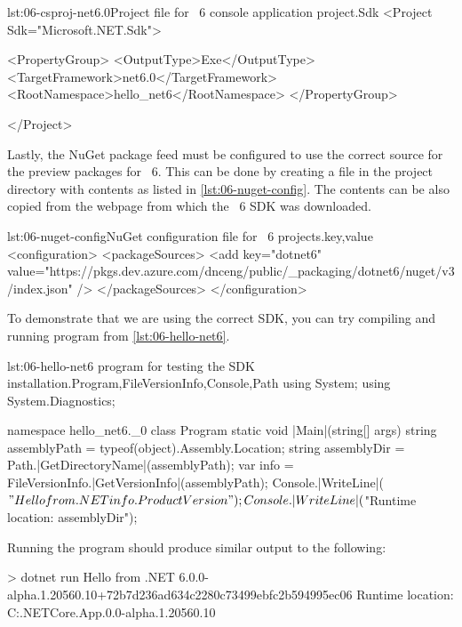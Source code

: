 \begin{myListingXml}{lst:06-csproj-net6.0}{Project file for \dotnet{}~6 console application project.}{Sdk}
<Project Sdk="Microsoft.NET.Sdk">

  <PropertyGroup>
    <OutputType>Exe</OutputType>
    <TargetFramework>net6.0</TargetFramework>
    <RootNamespace>hello_net6</RootNamespace>
  </PropertyGroup>

</Project>
\end{myListingXml}

Lastly, the NuGet package feed must be configured to use the correct source for the preview packages
for \dotnet{}~6. This can be done by creating a  file in the project
directory with contents as listed in \autoref{lst:06-nuget-config}. The contents can be also copied
from the webpage from which the \dotnet{}~6 SDK was downloaded.

\begin{myListingXml}[basicstyle=\ttfamily\scriptsize]{lst:06-nuget-config}{NuGet configuration file for \dotnet{}~6 projects.}{key,value}
<configuration>
  <packageSources>
    <add key="dotnet6"
      value="https://pkgs.dev.azure.com/dnceng/public/_packaging/dotnet6/nuget/v3/index.json" />
  </packageSources>
</configuration>
\end{myListingXml}

To demonstrate that we are using the correct SDK, you can try compiling and running program from
\autoref{lst:06-hello-net6}.

\begin{myListingCsharp}{lst:06-hello-net6}{\csharp{} program for testing the SDK installation.}{Program,FileVersionInfo,Console,Path}{}
using System;
using System.Diagnostics;

namespace hello_net6._0
{
    class Program
    {
        static void |Main|(string[] args)
        {
            string assemblyPath = typeof(object).Assembly.Location;
            string assemblyDir = Path.|GetDirectoryName|(assemblyPath);
            var info = FileVersionInfo.|GetVersionInfo|(assemblyPath);
            Console.|WriteLine|($"Hello from .NET {info.ProductVersion}");
            Console.|WriteLine|($"Runtime location: {assemblyDir}");
        }
    }
}
\end{myListingCsharp}

Running the program should produce similar output to the following:

\begin{myVerbatim}
> dotnet run
Hello from .NET 6.0.0-alpha.1.20560.10+72b7d236ad634c2280c73499ebfc2b594995ec06
Runtime location: C:\dotnet\shared\Microsoft.NETCore.App\6.0.0-alpha.1.20560.10
\end{myVerbatim}

